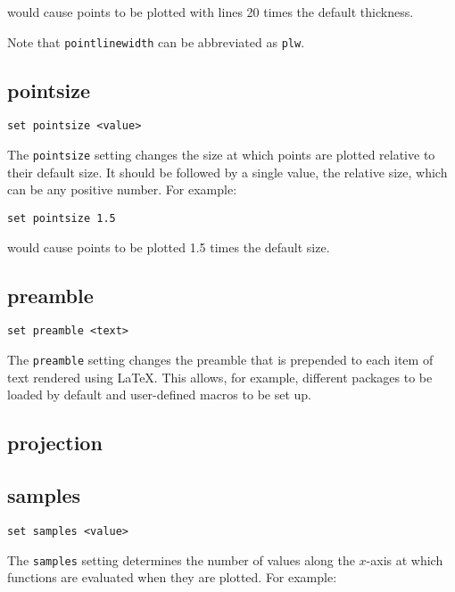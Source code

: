 \noindent would cause points to be plotted with lines 20 times the default thickness.

Note that {\tt pointlinewidth} can be abbreviated as {\tt plw}.


\subsection{pointsize}

\begin{verbatim}
set pointsize <value>
\end{verbatim}

The {\tt pointsize} setting changes the size at which points are plotted
relative to their default size. It should be followed by a single value, the
relative size, which can be any positive number. For example:

\begin{verbatim}
set pointsize 1.5
\end{verbatim}

\noindent would cause points to be plotted 1.5 times the default size.


\subsection{preamble}

\begin{verbatim}
set preamble <text>
\end{verbatim}

The {\tt preamble} setting changes the preamble that is prepended to each item of
text rendered using \LaTeX{}.  This allows, for example, different packages to
be loaded by default and user-defined macros to be set up.


\subsection{projection}


\subsection{samples}

\begin{verbatim}
set samples <value>
\end{verbatim}

The {\tt samples} setting determines the number of values along the $x$-axis at
which functions are evaluated when they are plotted. For example:

